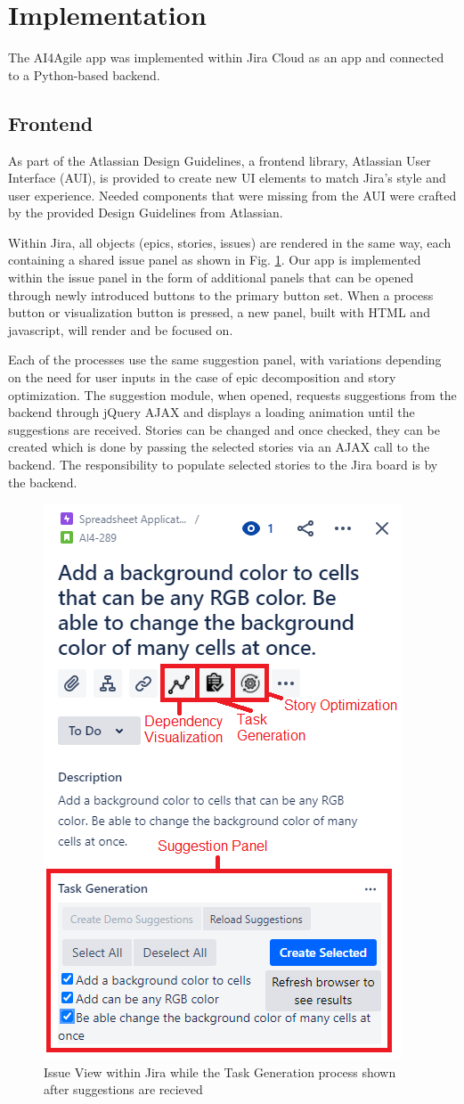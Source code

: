 \section{Implementation}
\label{implementation}

The AI4Agile app was implemented within Jira Cloud as an app and connected to a Python-based backend.

\subsection{Frontend}

As part of the Atlassian Design Guidelines, a frontend library, Atlassian User Interface (AUI), is provided to create new UI elements to match Jira’s style and user experience. Needed components that were missing from the AUI were crafted by the provided Design Guidelines from Atlassian.

Within Jira, all objects (epics, stories, issues) are rendered in the same way, each containing a shared issue panel as shown in Fig. \ref{fig:issueView}. Our app is implemented within the issue panel in the form of additional panels that can be opened through newly introduced buttons to the primary button set. When a process button or visualization button is pressed, a new panel, built with HTML and javascript, will render and be focused on.

Each of the processes use the same suggestion panel, with variations depending on the need for user inputs in the case of epic decomposition and story optimization. The suggestion module, when opened, requests suggestions from the backend through jQuery AJAX and displays a loading animation until the suggestions are received. Stories can be changed and once checked, they can be created which is done by passing the selected stories via an AJAX call to the backend. The responsibility to populate selected stories to the Jira board is by the backend.

\begin{figure}
\centering
\includegraphics[width=.5\textwidth,keepaspectratio]{./figure/Frontend.png}
\caption{Issue View within Jira while the Task Generation process shown after suggestions are recieved}
\label{fig:issueView}
\end{figure}

